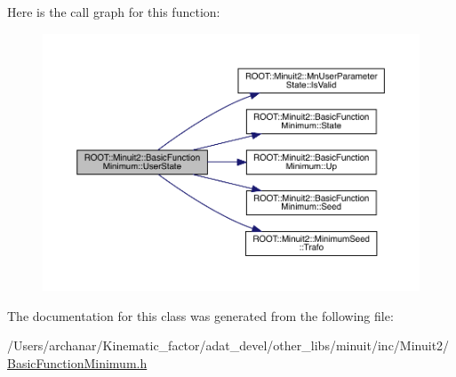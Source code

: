 Here is the call graph for this function\+:
\nopagebreak
\begin{figure}[H]
\begin{center}
\leavevmode
\includegraphics[width=350pt]{de/d25/classROOT_1_1Minuit2_1_1BasicFunctionMinimum_ac1757a094afe32c23b548fafaff5acc1_cgraph}
\end{center}
\end{figure}


The documentation for this class was generated from the following file\+:\begin{DoxyCompactItemize}
\item 
/\+Users/archanar/\+Kinematic\+\_\+factor/adat\+\_\+devel/other\+\_\+libs/minuit/inc/\+Minuit2/\mbox{\hyperlink{other__libs_2minuit_2inc_2Minuit2_2BasicFunctionMinimum_8h}{Basic\+Function\+Minimum.\+h}}\end{DoxyCompactItemize}
